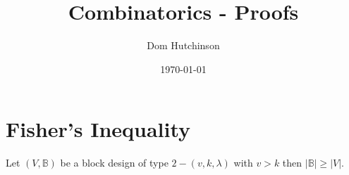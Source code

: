 \documentclass[11pt,a4paper]{article}
\begin{document}
\pagestyle{fancy}
\setlength\parindent{0pt}
\allowdisplaybreaks

\renewcommand{\headrulewidth}{0pt}

\title{Combinatorics - Proofs}
\author{Dom Hutchinson}
\date{\today}
\maketitle

\fancyhead[R]{\today}

\newcommand{\dotprod}[0]{\boldsymbol{\cdot}}
\newcommand{\cosech}[0]{\mathrm{cosech}\ }
\newcommand{\cosec}[0]{\mathrm{cosec}\ }
\newcommand{\sech}[0]{\mathrm{sech}\ }
\newcommand{\blocks}[0]{\mathbb{B}}
\newcommand{\nats}[0]{\mathbb{N}}
\newcommand{\reals}[0]{\mathbb{R}}
\newcommand{\rank}[0]{\mathrm{rank}}
\newcommand{\integers}[0]{\mathbb{Z}}
\newcommand{\nb}[0]{\textit{N.B.} }

\section*{Fisher's Inequality}
Let $(V,\mathbb{B})$ be a block design of type $2-(v,k,\lambda)$ with $v>k$ then $|\mathbb{B}|\geq|V|$.
\end{document}

